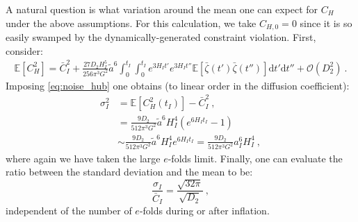 \documentclass[amsmath,amssymb,11pt]{article}
\begin{document}
A natural question is what variation around the mean one can expect for $C_H$ under the above assumptions. For this calculation, we take $C_{H,0} = 0$ since it is so easily swamped by the dynamically-generated constraint violation. First, consider:
\begin{equation}
\begin{split}
    \mathbb{E}[ C_H^2 ] = \bar{C}_I ^2 +\frac{27 D_2 H_I^5}{256\pi^3 G^2} \tilde{a}^6 \int_{0}^{t_I} \int_{0}^{t_I} e^{3H_I t'} e^{3H_I t''}  \mathbb{E}[ \bar{\zeta}(t') \bar{\zeta}(t'') ] \text{d}t'\text{d}t'' + \mathcal{O}(D_2^2) \ .
\end{split}
\end{equation}
Imposing \eqref{eq:noise_hub} one obtains (to linear order in the diffusion coefficient):
\begin{equation}
\begin{split}
    \sigma_{I}^2 &=  \mathbb{E}[ C_H^2(t_I)] -\bar{ C}_I ^2 \ , \\
    &=  \frac{9 D_2 }{512\pi^3 G^2} \tilde{a}^6 H_I^4 \left(e^{6H_I t_I}- 1\right) \\
    & \sim \frac{9 D_2 }{512\pi^3 G^2} \tilde{a}^6 H_I^4 e^{6H_I t_I} = \frac{9 D_2 }{512\pi^3 G^2} a_I^6 H_I^4 \ ,
\end{split}
\end{equation}
where again we have taken the large $e$-folds limit. Finally, one can evaluate the ratio between the standard deviation and the mean to be:
\begin{equation}
    \frac{\sigma_{I}}{\bar{C}_I} =  \frac{\sqrt{32\pi}}{\sqrt{ D_2}} \ ,
\end{equation}
independent of the number of $e$-folds during or after inflation.
\end{document}

